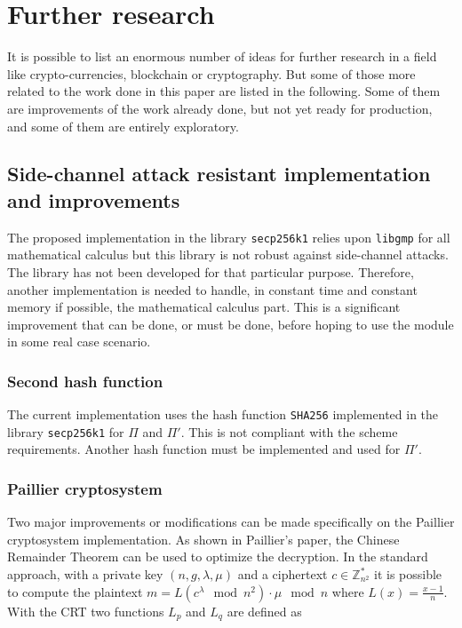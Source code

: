 \chapter{Further research}
\label{chap:furtherResearch}

It is possible to list an enormous number of ideas for further research in a field
like crypto-currencies, blockchain or cryptography. But some of those more related to the work
done in this paper are listed in the following. Some of them are improvements of
the work already done, but not yet ready for production, and some of them are
entirely exploratory.

\section{Side-channel attack resistant implementation and improvements}

The proposed implementation in the library \texttt{secp256k1} relies upon
\texttt{libgmp} for all mathematical calculus but this library is
not robust against side-channel attacks. The library has not
been developed for that particular purpose. Therefore, another implementation
is needed to handle, in constant time and constant memory if
possible, the mathematical calculus part. This is a significant improvement that
can be done, or must be done, before hoping to use the module in some real case
scenario.

\subsection{Second hash function}

The current implementation uses the hash function \texttt{SHA256} implemented
in the library \texttt{secp256k1} for $\Pi$ and $\Pi'$. This is not compliant
with the scheme requirements. Another hash function must be implemented
and used for $\Pi'$.

\subsection{Paillier cryptosystem}

Two major improvements or modifications can be made specifically on the
Paillier cryptosystem implementation. As shown in Paillier's paper, the
Chinese Remainder Theorem can be used to optimize the decryption. In the
standard approach, with a private key $(n, g, \lambda, \mu)$ and a ciphertext $c
\in \mathbb{Z}_{n^2}^*$ it is possible to compute the plaintext $m =
L(c^{\lambda} \mod n^2) \cdot \mu \mod n$ where $L(x) = \frac{x-1}{n}$. With the
CRT two functions $L_p$ and $L_q$ are defined as


